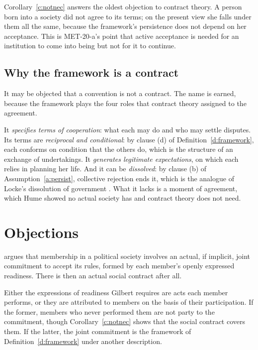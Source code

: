 \documentclass{situationist-preprint}
\begin{document}
Corollary~\ref{c:notnec} answers the oldest objection to contract theory. A person born into a society did not agree to its terms; on the present view she falls under them all the same, because the framework's persistence does not depend on her acceptance. This is MET-20-a's point that active acceptance is needed for an institution to come into being but not for it to continue.

\subsection{Why the framework is a contract}

It may be objected that a convention is not a contract. The name is earned, because the framework plays the four roles that contract theory assigned to the agreement.

It \emph{specifies terms of cooperation}: what each may do and who may settle disputes. Its terms are \emph{reciprocal and conditional}: by clause (d) of Definition~\ref{d:framework}, each conforms on condition that the others do, which is the structure of an exchange of undertakings. It \emph{generates legitimate expectations}, on which each relies in planning her life. And it can be \emph{dissolved}: by clause (b) of Assumption~\ref{a:persist}, collective rejection ends it, which is the analogue of Locke's dissolution of government \citep[\S\S 211--222]{Locke1689}. What it lacks is a moment of agreement, which Hume showed no actual society has and contract theory does not need.

\section{Objections}

\begin{objection}
\citet{Gilbert2006} argues that membership in a political society involves an actual, if implicit, joint commitment to accept its rules, formed by each member's openly expressed readiness. There is then an actual social contract after all.
\end{objection}

\begin{reply}
Either the expressions of readiness Gilbert requires are acts each member performs, or they are attributed to members on the basis of their participation. If the former, members who never performed them are not party to the commitment, though Corollary~\ref{c:notnec} shows that the social contract covers them. If the latter, the joint commitment is the framework of Definition~\ref{d:framework} under another description.
\end{reply}
\end{document}
